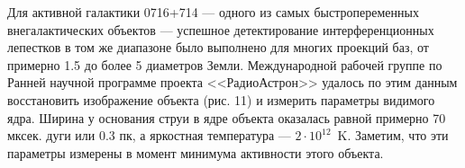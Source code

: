 Для активной галактики 0716+714 --- одного из самых быстропеременных внегалактических объектов ---
успешное детектирование интерференционных лепестков в том же диапазоне было выполнено для многих
проекций баз, от примерно 1.5 до более 5 диаметров Земли. Международной рабочей группе по Ранней
научной программе проекта <<РадиоАстрон>> удалось по этим данным восстановить изображение объекта
(рис. 11) и измерить параметры видимого ядра. Ширина у основания струи в ядре объекта оказалась
равной примерно 70 мксек. дуги или 0.3 пк, а яркостная температура --- $2 \cdot 10^{12}$~K. Заметим,
что эти параметры измерены в момент минимума активности этого объекта.

\begin{figure}[tbh]
\end{figure}
